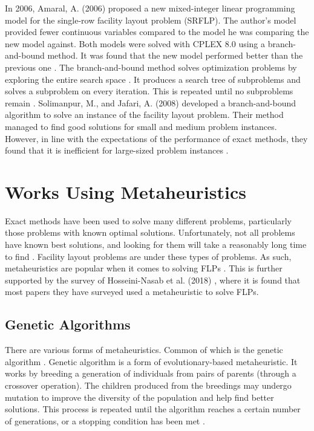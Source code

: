 In 2006, Amaral, A. (2006) proposed a new mixed-integer linear programming model for the single-row facility layout problem (SRFLP). The author's model provided fewer continuous variables compared to the model he was comparing the new model against. Both models were solved with CPLEX 8.0 using a branch-and-bound method. It was found that the new model performed better than the previous one \cite{Amaral2006}. The branch-and-bound method solves optimization problems by exploring the entire search space \cite{Datta2020}. It produces a search tree of subproblems and solves a subproblem on every iteration. This is repeated until no subproblems remain \cite{Morrison2016}. Solimanpur, M., and Jafari, A. (2008) developed a branch-and-bound algorithm to solve an instance of the facility layout problem. Their method managed to find good solutions for small and medium problem instances. However, in line with the expectations of the performance of exact methods, they found that it is inefficient for large-sized problem instances \cite{Solimanpur2008}.

\section{Works Using Metaheuristics}
Exact methods have been used to solve many different problems, particularly those problems with known optimal solutions. Unfortunately, not all problems have known best solutions, and looking for them will take a reasonably long time to find \cite{Glover2015}. Facility layout problems are under these types of problems. As such, metaheuristics are popular when it comes to solving FLPs \cite{Drira2007}. This is further supported by the survey of Hosseini-Nasab et al. (2018) \cite{Hosseini-Nasab2018}, where it is found that most papers they have surveyed used a metaheuristic to solve FLPs.

\subsection{Genetic Algorithms}

There are various forms of metaheuristics. Common of which is the genetic algorithm \cite{Hosseini-Nasab2018}. Genetic algorithm is a form of evolutionary-based metaheuristic. It works by breeding a generation of individuals from pairs of parents (through a crossover operation). The children produced from the breedings may undergo mutation to improve the diversity of the population and help find better solutions. This process is repeated until the algorithm reaches a certain number of generations, or a stopping condition has been met \cite{Luke2013Metaheuristics}.

